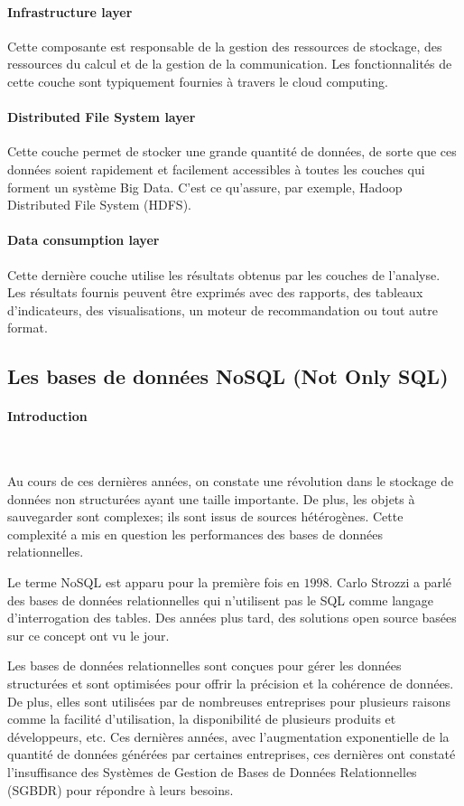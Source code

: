 		\paragraph{Infrastructure layer} Cette composante est responsable de la gestion des ressources de stockage, des ressources du calcul et de la gestion de la communication. Les fonctionnalités de cette couche sont typiquement fournies à travers le cloud computing.
		\paragraph{Distributed File System layer} Cette couche permet de stocker une grande quantité de données, de sorte que ces données soient rapidement et facilement accessibles à toutes les couches qui forment un système  Big Data. C'est ce qu'assure, par exemple, Hadoop Distributed File System (HDFS).
		\paragraph{Data consumption layer} Cette dernière couche utilise les résultats obtenus par les couches de l'analyse. Les résultats fournis peuvent être exprimés avec des rapports, des tableaux d'indicateurs, des visualisations, un moteur de recommandation ou tout autre format.
	\subsection{Les bases de données NoSQL (Not Only SQL) } \label{sec:nosql}
	\paragraph{Introduction } ~
	
    Au cours de ces dernières années, on constate une révolution dans le stockage de données non structurées ayant une taille importante.  De plus,  les objets à sauvegarder sont complexes; ils sont issus de sources hétérogènes.  Cette complexité a mis en question les performances des bases de données relationnelles. 
	
	Le terme NoSQL est apparu pour la première fois en $ 1998 $. Carlo Strozzi \cite{CarloStrozziNosql} a parlé des bases de données relationnelles qui n'utilisent pas le SQL comme langage d'interrogation des tables. Des années plus tard, des solutions  open source basées sur ce concept ont vu le jour. 
	
	Les bases de données relationnelles sont conçues pour gérer les données structurées et sont optimisées pour offrir la précision et la cohérence de données. De plus, elles sont utilisées par de nombreuses entreprises pour plusieurs raisons comme   la facilité d'utilisation, la disponibilité de plusieurs produits et développeurs, etc. Ces dernières années, avec l'augmentation exponentielle de la quantité de données générées par certaines entreprises, ces dernières ont constaté l'insuffisance des Systèmes de Gestion de Bases de Données Relationnelles (SGBDR) pour répondre à leurs besoins.
	
